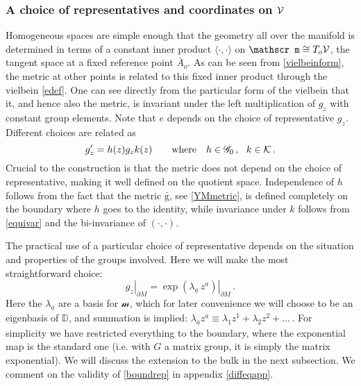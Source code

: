 \documentclass[11pt,a4paper]{article}
\def\calg{{\mathscr G}}
\def\calk{{\cal K}}
\def\calsm{{\boldsymbol{\mathscr m}}}
\def\calv{{\cal V}}
\def\ua{{\underline{a}}}
\def\rg{{\mathrm{g}}}
\def\Dperp{{\mathbb{D}}}
\begin{document}
  
   \subsubsection{A choice of representatives and coordinates on $\calv$}
   
   Homogeneous spaces are simple enough that the geometry all over the manifold is determined in terms of a constant inner product $\langle\cdot,\cdot\rangle$ on $\calsm\cong T_o\calv$, the tangent space at a fixed reference point $\bar A_o$. As can be seen from \eqref{vielbeinform}, the metric at other points is related to this fixed inner product through the vielbein \eqref{edef}. One can see directly from the particular form of the vielbein that it, and hence also the metric,  is invariant under the left multiplication of $g_z$ with constant group elements. Note that $e$ depends on the choice of representative $g_z$. Different choices are related as
   \begin{equation}
   g'_z=h(z) g_z k(z)\qquad \mbox{where}\quad h\in\calg_0\,,\ \ k\in\calk\,.
   \end{equation}
   Crucial to the construction is that the metric does not depend on the choice of representative, making it well defined on the quotient space. Independence of $h$ follows from the fact that the metric $\bar\rg$, see \eqref{YMmetric}, is defined completely on the boundary where $h$ goes to the identity, while invariance under $k$ follows from \eqref{equivar} and the bi-invariance of $(\cdot,\cdot)$.
   
   The practical use of a particular choice of representative depends on the situation and properties of the groups involved. Here we will  make the most straightforward choice:
   \begin{equation}
   \left.g_z\right|_{\partial M}=\left.\exp(\lambda_\ua\, z^a)\right|_{\partial M}\,.\label{boundrep}
   \end{equation}
   Here the $\lambda_\ua$ are a basis for $\calsm$, which for later convenience we will choose to be an eigenbasis of $\Dperp$, and summation is implied: $\lambda_{\ua}z^a\equiv\lambda_{\underline{1}}z^1+\lambda_{\underline{2}}z^2+\ldots$\,. For simplicity we have restricted everything to the boundary, where the exponential map is the standard one (i.e. with $G$ a matrix group, it is simply the matrix exponential).  We will discuss the extension to the bulk in the next subsection. We comment on the validity of \eqref{boundrep} in appendix \ref{diffeqapp}. 
   
\end{document}
